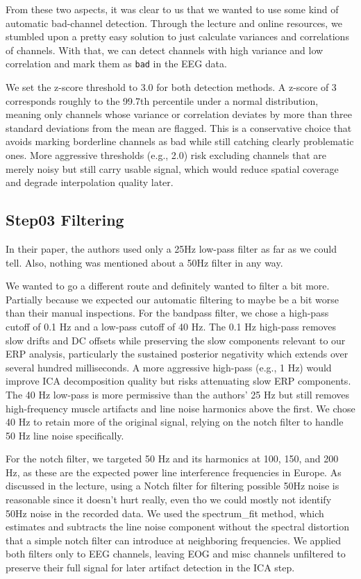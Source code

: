 \documentclass{scrartcl}
\begin{document}
From these two aspects, it was clear to us that we wanted to use some kind of automatic bad-channel detection.
Through the lecture and online resources, we stumbled upon a pretty easy solution to just calculate variances and correlations of channels. With that, we can detect channels with high variance and low correlation and mark them as \texttt{bad} in the EEG data.

We set the z-score threshold to 3.0 for both detection methods. A z-score of 3 corresponds roughly to the 99.7th percentile under a normal distribution, meaning only channels whose variance or correlation deviates by more than three standard deviations from the mean are flagged. This is a conservative choice that avoids marking borderline channels as bad while still catching clearly problematic ones. More aggressive thresholds (e.g., 2.0) risk excluding channels that are merely noisy but still carry usable signal, which would reduce spatial coverage and degrade interpolation quality later.

\subsection{Step03 Filtering}
In their paper, the authors used only a 25Hz low-pass filter as far as we could tell. Also, nothing was mentioned about a 50Hz filter in any way.

We wanted to go a different route and definitely wanted to filter a bit more. Partially because we expected our automatic filtering to maybe be a bit worse than their manual inspections. For the bandpass filter, we chose a high-pass cutoff of 0.1 Hz and a low-pass cutoff of 40 Hz. The 0.1 Hz high-pass removes slow drifts and DC offsets while preserving the slow components relevant to our ERP analysis, particularly the sustained posterior negativity which extends over several hundred milliseconds. A more aggressive high-pass (e.g., 1 Hz) would improve ICA decomposition quality but risks attenuating slow ERP components. The 40 Hz low-pass is more permissive than the authors' 25 Hz but still removes high-frequency muscle artifacts and line noise harmonics above the first. We chose 40 Hz to retain more of the original signal, relying on the notch filter to handle 50 Hz line noise specifically.

For the notch filter, we targeted 50 Hz and its harmonics at 100, 150, and 200 Hz, as these are the expected power line interference frequencies in Europe. As discussed in the lecture, using a Notch filter for filtering possible 50Hz noise is reasonable since it doesn't hurt really, even tho we could mostly not identify 50Hz noise in the recorded data. We used the spectrum\_fit method, which estimates and subtracts the line noise component without the spectral distortion that a simple notch filter can introduce at neighboring frequencies. We applied both filters only to EEG channels, leaving EOG and misc channels unfiltered to preserve their full signal for later artifact detection in the ICA step.
\end{document}
